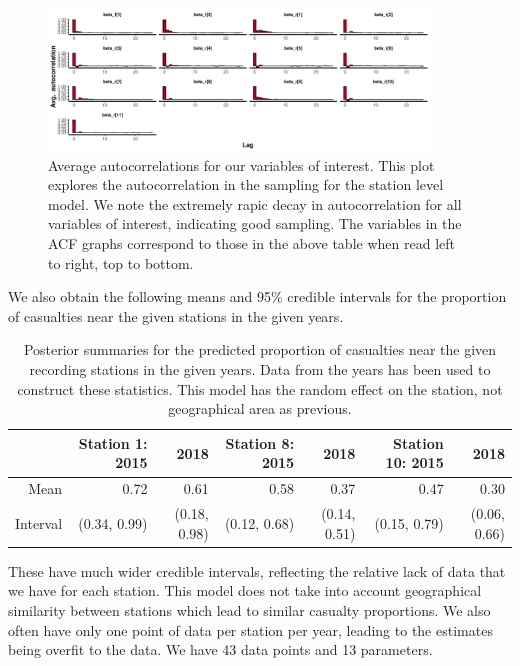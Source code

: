 \documentclass[10pt]{extarticle}
\begin{document}
\begin{figure}[H]
	\centering
	\includegraphics[width = 0.90\textwidth]{../acf_station}
	\caption{Average autocorrelations for our variables of interest. This plot explores the autocorrelation in the sampling for the station level model. We note the extremely rapic decay in autocorrelation for all variables of interest, indicating good sampling. The variables in the ACF graphs correspond to those in the above table when read left to right, top to bottom. }
	\label{fig:acfstation}
\end{figure}

We also obtain the following means and 95\% credible intervals for the proportion of casualties near the given stations in the given years. 

\begin{table}[H]
	\centering
	\footnotesize
	\begin{tabular}{r|rr|rr|rr}
		\hline
		& Station 1: 2015 & 2018 & Station 8: 2015 & 2018 & Station 10: 2015 & 2018 \\
		\hline
		Mean & 0.72 & 0.61 & 0.58 & 0.37 & 0.47 & 0.30 \\
		Interval & (0.34, 0.99) & (0.18, 0.98) & (0.12, 0.68) & (0.14, 0.51) & (0.15, 0.79) & (0.06, 0.66)\\
		\hline
	\end{tabular}
	\caption{Posterior summaries for the predicted proportion of casualties near the given recording stations in the given years. Data from the years has been used to construct these statistics. This model has the random effect on the station, not geographical area as previous.}
	\label{tab:postprop_stat}
\end{table}

These have much wider credible intervals, reflecting the relative lack of data that we have for each station. This model does not take into account geographical similarity between stations which lead to similar casualty proportions. We also often have only one point of data per station per year, leading to the estimates being overfit to the data. We have 43 data points and 13 parameters. 
\end{document}
